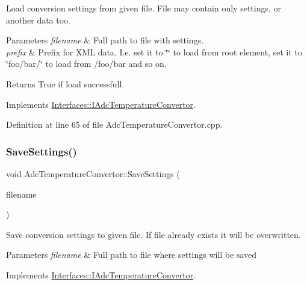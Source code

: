 Load conversion settings from given file. File may contain only settings, or another data too. 


\begin{DoxyParams}{Parameters}
{\em filename} & Full path to file with settings. \\
\hline
{\em prefix} & Prefix for X\+ML data. I.\+e. set it to \char`\"{}\char`\"{} to load from root element, set it to \char`\"{}foo/bar/\char`\"{} to load from /foo/bar and so on. \\
\hline
\end{DoxyParams}
\begin{DoxyReturn}{Returns}
True if load successfull. 
\end{DoxyReturn}


Implements \hyperlink{class_interfaces_1_1_i_adc_temperature_convertor_a3b1d84ea243b62a36238f16433668a23}{Interfaces\+::\+I\+Adc\+Temperature\+Convertor}.



Definition at line 65 of file Adc\+Temperature\+Convertor.\+cpp.

\mbox{\label{class_adc_temperature_convertor_aa6935469c6bb9e2df9a21495d7e8b72a}} 
\subsubsection{\texorpdfstring{Save\+Settings()}{SaveSettings()}}
{\footnotesize\ttfamily void Adc\+Temperature\+Convertor\+::\+Save\+Settings (\begin{DoxyParamCaption}\item[{Q\+String}]{filename }\end{DoxyParamCaption})\hspace{0.3cm}{\ttfamily [virtual]}}



Save conversion settings to given file. If file already exists it will be overwritten. 


\begin{DoxyParams}{Parameters}
{\em filename} & Full path to file where settings will be saved \\
\hline
\end{DoxyParams}


Implements \hyperlink{class_interfaces_1_1_i_adc_temperature_convertor_a6631e979e067ab78d3e5c337449876ac}{Interfaces\+::\+I\+Adc\+Temperature\+Convertor}.



